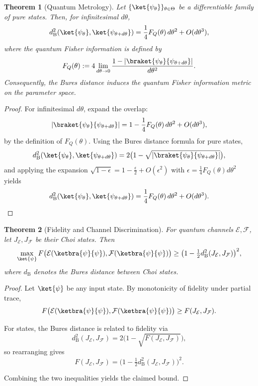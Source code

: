 \documentclass[aps,pra,reprint,nofootinbib,showpacs,superscriptaddress]{revtex4-1}
\newtheorem{theorem}{Theorem}[section]
\begin{document}
\begin{theorem}[Quantum Metrology]
\label{thm:metrology}
Let $\{\ket{\psi_\theta}\}_{\theta \in \Theta}$ be a differentiable family of pure states. Then, for infinitesimal $d\theta$,
\[
d_{\text{B}}^2(\ket{\psi_\theta},\ket{\psi_{\theta + d\theta}}) = \frac{1}{4} F_Q(\theta) \, d\theta^2 + O(d\theta^3),
\]
where the quantum Fisher information is defined by
\[
F_Q(\theta) := 4 \lim_{d\theta \to 0} \frac{1 - |\braket{\psi_\theta}{\psi_{\theta+d\theta}}|}{d\theta^2}.
\]
Consequently, the Bures distance induces the quantum Fisher information metric on the parameter space.
\end{theorem}

\begin{proof}
For infinitesimal $d\theta$, expand the overlap:
\[
|\braket{\psi_\theta}{\psi_{\theta+d\theta}}| = 1 - \frac{1}{4} F_Q(\theta) \, d\theta^2 + O(d\theta^3),
\]
by the definition of $F_Q(\theta)$. Using the Bures distance formula for pure states,
\[
d_{\text{B}}^2(\ket{\psi_\theta},\ket{\psi_{\theta+d\theta}}) = 2\big(1 - \sqrt{|\braket{\psi_\theta}{\psi_{\theta+d\theta}}|}\big),
\]
and applying the expansion $\sqrt{1 - \epsilon} = 1 - \frac{\epsilon}{2} + O(\epsilon^2)$ with $\epsilon = \frac{1}{4} F_Q(\theta) d\theta^2$ yields
\[
d_{\text{B}}^2(\ket{\psi_\theta},\ket{\psi_{\theta+d\theta}}) = \frac{1}{4} F_Q(\theta) \, d\theta^2 + O(d\theta^3).
\]
\end{proof}
\begin{theorem}[Fidelity and Channel Discrimination]
\label{thm:channel}
For quantum channels $\mathcal{E},\mathcal{F}$, let $J_\mathcal{E}, J_\mathcal{F}$ be their Choi states. Then
\[
\max_{\ket{\psi}} F\big(\mathcal{E}(\ketbra{\psi}{\psi}), \mathcal{F}(\ketbra{\psi}{\psi})\big) 
\ge \big(1 - \tfrac{1}{2} d_{\text{B}}^2(J_\mathcal{E}, J_\mathcal{F})\big)^2,
\]
where $d_{\text{B}}$ denotes the Bures distance between Choi states.
\end{theorem}

\begin{proof}
Let $\ket{\psi}$ be any input state. By monotonicity of fidelity under partial trace,
\[
F\big(\mathcal{E}(\ketbra{\psi}{\psi}), \mathcal{F}(\ketbra{\psi}{\psi})\big)
\ge F(J_\mathcal{E}, J_\mathcal{F}).
\]

For states, the Bures distance is related to fidelity via
\[
d_{\text{B}}^2(J_\mathcal{E}, J_\mathcal{F}) = 2\big(1 - \sqrt{F(J_\mathcal{E}, J_\mathcal{F})}\big),
\]
so rearranging gives
\[
F(J_\mathcal{E}, J_\mathcal{F}) = \big(1 - \tfrac{1}{2} d_{\text{B}}^2(J_\mathcal{E}, J_\mathcal{F})\big)^2.
\]

Combining the two inequalities yields the claimed bound.
\end{proof}
\end{document}
